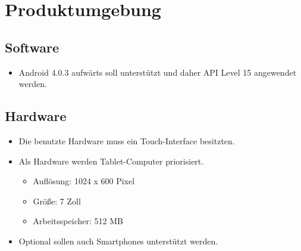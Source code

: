 \chapter{Produktumgebung}

\section{Software}
\begin{itemize}
	\item Android 4.0.3 aufwärts soll unterstützt und daher API Level 15 angewendet werden.
\end{itemize}
\section{Hardware}
\begin{itemize}
	\item Die benutzte Hardware muss ein Touch-Interface besitzten.
	\item Als Hardware werden Tablet-Computer priorisiert.
	\begin{itemize}
		\item Auflösung: 1024 x 600 Pixel
		\item Größe: 7 Zoll
		\item Arbeitsspeicher: 512 MB
	\end{itemize}
	\item Optional sollen auch Smartphones unterstützt werden.
\end{itemize}

